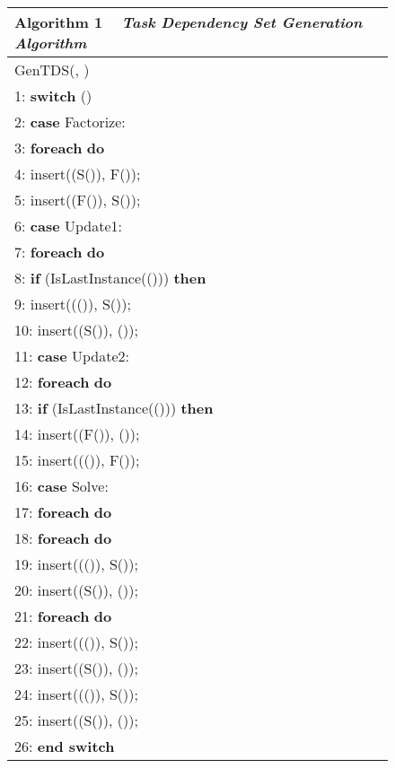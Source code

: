 \documentclass[12pt]{elsarticle}
\begin{document}
\begin{figure}\centering
\begin{tabular}{@{}p{\columnwidth}@{}}
\toprule
\textbf{Algorithm 1} ~ \textit{Task Dependency Set Generation Algorithm}
\\\midrule
\textsf{GenTDS}\textsf{(}, \textsf{)}\\
\hspace{2.09mm}1: \textbf{switch} ()\\
\hspace{2.09mm}2: \quad \textbf{case} \textsf{Factorize}:\\
\hspace{2.09mm}3: \quad\quad \textbf{foreach}  \textbf{do}\\\hspace{2.09mm}4: \quad\quad\quad \textsf{insert((S()), F());}\\\hspace{2.09mm}5: \quad\quad\quad \textsf{insert((F()), S());}\\
\hspace{2.09mm}6: \quad \textbf{case} \textsf{Update1}:\\
\hspace{2.09mm}7: \quad\quad \textbf{foreach}  \textbf{do}\\
\hspace{2.09mm}8: \quad\quad\quad \textbf{if} (\textsf{IsLastInstance(())}) \textbf{then}\\
\hspace{2.09mm}9: \quad\quad\quad\quad \textsf{insert((()), S());}\\10: \quad\quad\quad\quad \textsf{insert((S()), ());}\\
11: \quad \textbf{case} \textsf{Update2}:\\
12: \quad\quad \textbf{foreach}  \textbf{do}\\
13: \quad\quad\quad \textbf{if} (\textsf{IsLastInstance(())}) \textbf{then}\\
14: \quad\quad\quad\quad \textsf{insert((F()), ());}\\15: \quad\quad\quad\quad \textsf{insert((()), F());}\\
16: \quad \textbf{case} \textsf{Solve}:\\
17: \quad\quad \textbf{foreach}  \textbf{do}\\
18: \quad\quad\quad \textbf{foreach}  \textbf{do}\\
19: \quad\quad\quad\quad \textsf{insert((()), S());}\\20: \quad\quad\quad\quad \textsf{insert((S()), ());}\\
21: \quad\quad\quad \textbf{foreach}  \textbf{do}\\
22: \quad\quad\quad\quad \textsf{insert((()), S());}\\23: \quad\quad\quad\quad \textsf{insert((S()), ());}\\
24: \quad\quad\quad \textsf{insert((()), S());}\\25: \quad\quad\quad \textsf{insert((S()), ());}\\
26: \textbf{end switch}\\
\midrule
\end{tabular}
\end{figure}
\end{document}
